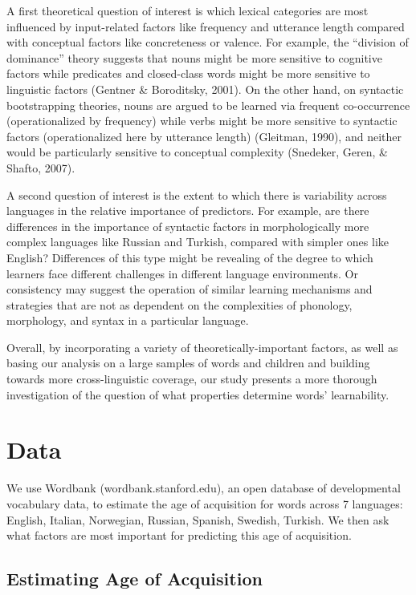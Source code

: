 \documentclass[10pt, letterpaper]{article}
\begin{document}
A first theoretical question of interest is which lexical categories are
most influenced by input-related factors like frequency and utterance
length compared with conceptual factors like concreteness or valence.
For example, the ``division of dominance'' theory suggests that nouns
might be more sensitive to cognitive factors while predicates and
closed-class words might be more sensitive to linguistic factors
(Gentner \& Boroditsky, 2001). On the other hand, on syntactic
bootstrapping theories, nouns are argued to be learned via frequent
co-occurrence (operationalized by frequency) while verbs might be more
sensitive to syntactic factors (operationalized here by utterance
length) (Gleitman, 1990), and neither would be particularly sensitive to
conceptual complexity (Snedeker, Geren, \& Shafto, 2007).

A second question of interest is the extent to which there is
variability across languages in the relative importance of predictors.
For example, are there differences in the importance of syntactic
factors in morphologically more complex languages like Russian and
Turkish, compared with simpler ones like English? Differences of this
type might be revealing of the degree to which learners face different
challenges in different language environments. Or consistency may
suggest the operation of similar learning mechanisms and strategies that
are not as dependent on the complexities of phonology, morphology, and
syntax in a particular language.

Overall, by incorporating a variety of theoretically-important factors,
as well as basing our analysis on a large samples of words and children
and building towards more cross-linguistic coverage, our study presents
a more thorough investigation of the question of what properties
determine words' learnability.

\section{Data}\label{data}

We use Wordbank (wordbank.stanford.edu), an open database of
developmental vocabulary data, to estimate the age of acquisition for
words across 7 languages: English, Italian, Norwegian, Russian, Spanish,
Swedish, Turkish. We then ask what factors are most important for
predicting this age of acquisition.

\subsection{Estimating Age of
Acquisition}\label{estimating-age-of-acquisition}
\end{document}
